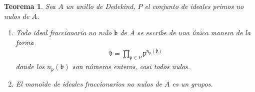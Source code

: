 \documentclass[10pt,oneside,bibtotoc,smallheadings,leqno,a5paper,DIV=12]{scrbook}
\newcommand{\idl}[1]{\mathfrak{#1}}
\numberwithin{equation}{section}
\theoremstyle{defi}
\theoremstyle{enonce}
\newtheorem{theorem}{Teorema}
\theoremstyle{rem}
\numberwithin{theorem}{section}
\numberwithin{proposition}{section}
\numberwithin{definition}{section}
\numberwithin{lemma}{section}
\numberwithin{corollary}{section}
\numberwithin{example}{section}
\numberwithin{footnote}{section}%
\begin{document}
\begin{theorem}\label{teo3.4.3}
Sea $A$ un anillo de Dedekind, $P$ el conjunto de ideales primos no nulos de $A$.
\begin{enumerate}
\item Todo ideal fraccionario no nulo $\idl{b}$ de $A$ se escribe de una \'unica manera de la forma
\begin{gather}\label{eq-3.4-4}
\idl{b} = \prod_{\idl{p}\in P}\idl{p}^{n_{\idl{p}}(\idl{b})}
\end{gather}
donde los $n_{\idl{p}}(\idl{b})$ son n\'umeros enteros, casi todos nulos.
\item El monoide de ideales fraccionarios no nulos de $A$ es un grupos.
\end{enumerate}
\end{theorem}
\end{document}
